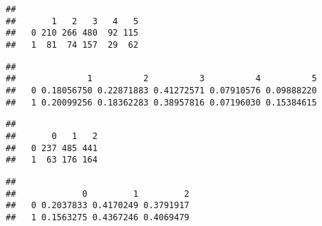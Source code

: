 \documentclass[10pt,]{book}
\newenvironment{Shaded}{\begin{snugshade}}{\end{snugshade}}
\newcommand{\DecValTok}[1]{\textcolor[rgb]{0.00,0.00,0.81}{#1}}
\newcommand{\KeywordTok}[1]{\textcolor[rgb]{0.13,0.29,0.53}{\textbf{#1}}}
\newcommand{\NormalTok}[1]{#1}
\newcommand{\OperatorTok}[1]{\textcolor[rgb]{0.81,0.36,0.00}{\textbf{#1}}}
\begin{document}
\begin{Shaded}
\end{Shaded}

\begin{verbatim}
##    
##       1   2   3   4   5
##   0 210 266 480  92 115
##   1  81  74 157  29  62
\end{verbatim}

\begin{Shaded}
\end{Shaded}

\begin{verbatim}
##    
##              1          2          3          4          5
##   0 0.18056750 0.22871883 0.41272571 0.07910576 0.09888220
##   1 0.20099256 0.18362283 0.38957816 0.07196030 0.15384615
\end{verbatim}

\begin{Shaded}
\end{Shaded}

\begin{verbatim}
##    
##       0   1   2
##   0 237 485 441
##   1  63 176 164
\end{verbatim}

\begin{Shaded}
\end{Shaded}

\begin{verbatim}
##    
##             0         1         2
##   0 0.2037833 0.4170249 0.3791917
##   1 0.1563275 0.4367246 0.4069479
\end{verbatim}
\end{document}

